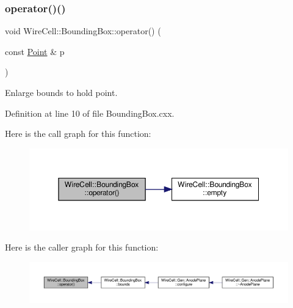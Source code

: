 \subsubsection{\texorpdfstring{operator()()}{operator()()}\hspace{0.1cm}{\footnotesize\ttfamily [1/3]}}
{\footnotesize\ttfamily void Wire\+Cell\+::\+Bounding\+Box\+::operator() (\begin{DoxyParamCaption}\item[{const \hyperlink{namespace_wire_cell_ab2b2565fa6432efbb4513c14c988cda9}{Point} \&}]{p }\end{DoxyParamCaption})}



Enlarge bounds to hold point. 



Definition at line 10 of file Bounding\+Box.\+cxx.

Here is the call graph for this function\+:
\nopagebreak
\begin{figure}[H]
\begin{center}
\leavevmode
\includegraphics[width=350pt]{class_wire_cell_1_1_bounding_box_a2f43d9aa9cf70e9515cdad9e43537575_cgraph}
\end{center}
\end{figure}
Here is the caller graph for this function\+:
\nopagebreak
\begin{figure}[H]
\begin{center}
\leavevmode
\includegraphics[width=350pt]{class_wire_cell_1_1_bounding_box_a2f43d9aa9cf70e9515cdad9e43537575_icgraph}
\end{center}
\end{figure}
\mbox{\label{class_wire_cell_1_1_bounding_box_afcc27be243bd23302b647ac9eafa536b}} 
